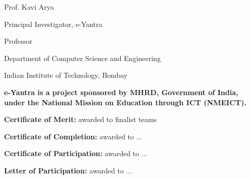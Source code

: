 \documentclass[a4paper,12pt]{article}
\begin{document}
\begin{minipage}{0.78\linewidth}
\begin{minipage}{0.7\linewidth}
\begin{tikzpicture}
        \end{tikzpicture}\par
        Prof. Kavi Arya\par
        Principal Investigator, e-Yantra\par
        Professor\par
        Department of Computer Science and Engineering\par
        Indian Institute of Technology, Bombay\par
        \vspace{15pt}
    \end{minipage}
    \begin{minipage}{0.15\linewidth}
    \end{minipage}
    \par
    \small{\textbf{e-Yantra is a project sponsored by MHRD, Government of India, under the National Mission on Education through ICT (NMEICT).}}\par\vspace{5pt}
    \footnotesize{\textbf{Certificate of Merit:} awarded to finalist teams\par
    \textbf{Certificate of Completion:} awarded to ...\par
    \textbf{Certificate of Participation:} awarded to ...\par
    \textbf{Letter of Participation:} awarded to ...}
\end{minipage}
\end{document}
